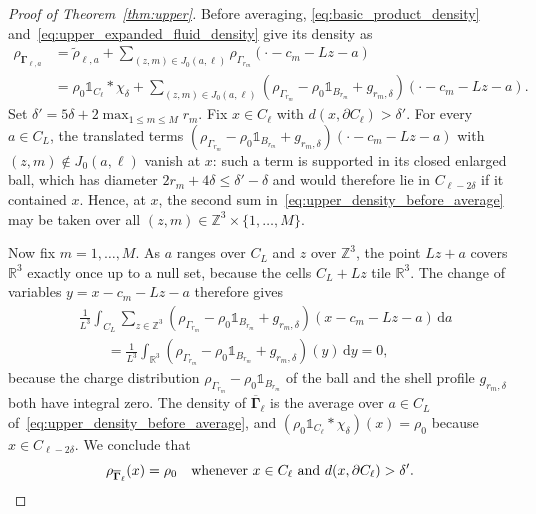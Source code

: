 \documentclass[final,reqno]{amsart}
\theoremstyle{remark}
\theoremstyle{definition}
\renewcommand{\le}{\leqslant}
\newcommand{\RR}{\mathbb{R}}
\newcommand{\ZZ}{\mathbb{Z}}
\newcommand{\iden}{\mathbb{1}}
\newcommand{\vGamma}{{\bm{\Gamma}}}
\begin{document}
\begin{proof}[Proof of Theorem~\ref{thm:upper}]
Before averaging, \eqref{eq:basic_product_density} and~\eqref{eq:upper_expanded_fluid_density} give its density as
\begin{equation}\label{eq:upper_density_before_average}
\begin{aligned}
\rho_{\vGamma_{\ell,a}}
&=\tilde\rho_{\ell,a}+\sum_{(z,m)\in J_0(a,\ell)}\rho_{\Gamma_{r_m}}(\cdot-c_m-Lz-a)\\
&=\rho_0\iden_{C_\ell}*\chi_\delta+
\sum_{(z,m)\in J_0(a,\ell)}(\rho_{\Gamma_{r_m}}-\rho_0\iden_{B_{r_m}}+g_{r_m,\delta})(\cdot-c_m-Lz-a).
\end{aligned}
\end{equation}
Set $\delta'=5\delta+2\max_{1\le m\le M}r_m$.
Fix $x\in C_\ell$ with $d(x,\partial C_\ell)>\delta'$. For every $a\in C_L$, the translated terms $(\rho_{\Gamma_{r_m}}-\rho_0\iden_{B_{r_m}}+g_{r_m,\delta})(\cdot-c_m-Lz-a)$ with $(z,m)\notin J_0(a,\ell)$ vanish at $x$: such a term is supported in its closed enlarged ball, which has diameter $2r_m+4\delta\le\delta'-\delta$ and would therefore lie in $C_{\ell-2\delta}$ if it contained $x$. Hence, at $x$, the second sum in~\eqref{eq:upper_density_before_average} may be taken over all $(z,m)\in\ZZ^3\times\{1,\dots,M\}$.

Now fix $m=1,\ldots,M$. As $a$ ranges over $C_L$ and $z$ over $\ZZ^3$, the point $Lz+a$ covers $\RR^3$ exactly once up to a null set, because the cells $C_L+Lz$ tile $\RR^3$. The change of variables $y=x-c_m-Lz-a$ therefore gives
\begin{align*}
&\frac1{L^3}\int_{C_L}\sum_{z\in\ZZ^3}
(\rho_{\Gamma_{r_m}}-\rho_0\iden_{B_{r_m}}+g_{r_m,\delta})(x-c_m-Lz-a)\,\mathrm da\\
&\qquad=\frac1{L^3}\int_{\RR^3}(\rho_{\Gamma_{r_m}}-\rho_0\iden_{B_{r_m}}+g_{r_m,\delta})(y)\,\mathrm dy
=0,
\end{align*}
because the charge distribution $\rho_{\Gamma_{r_m}}-\rho_0\iden_{B_{r_m}}$ of the ball and the shell profile $g_{r_m,\delta}$ both have integral zero. The density of $\overline{\vGamma}_\ell$ is the average over $a\in C_L$ of~\eqref{eq:upper_density_before_average}, and $(\rho_0\iden_{C_\ell}*\chi_\delta)(x)=\rho_0$ because $x\in C_{\ell-2\delta}$. We conclude that
\begin{equation}\label{eq:upper_density_bulk_exact}
\rho_{\overline{\vGamma}_\ell}(x)=\rho_0
\quad\hbox{whenever }x\in C_\ell\hbox{ and }d(x,\partial C_\ell)>\delta'.
\end{equation}


\end{proof}
\end{document}

